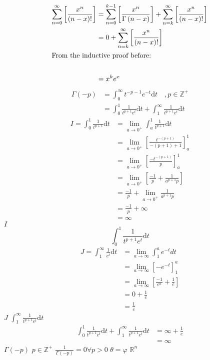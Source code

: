 \documentclass{article}
\begin{document}
\begin{align}
    \sum^{\infty}_{n= 0}   \left[ \frac{x^n}{\left( n- x \right)!} \right]  &= \sum^{k-1}_{n= 0}   \left[ \frac{x^{n}}{\Gamma\left( n- x \right)} \right]  +  \sum^{\infty}_{n= k}   \left[ \frac{x^{n}}{\left( n- x \right)!} \right] \\
    &= 0 +    \sum^{\infty}_{n= k}   \left[ \frac{x^{n}}{\left( n- x \right)!} \right] \\
    \intertext{From the inductive proof before:} \notag \\
    &= x^{k}e^{x}
\end{align}
\begin{align}
\Gamma (-p) &= \int_0^\infty t^{-p-1}e^{-t}\mathrm{d}t \quad , p \in \mathbb{Z}^{+}\\
&= \int_0^1 \frac{1}{t^{p+1}e^t} \mathrm{d}t + \int_1^\infty \frac{1}{t^{p+1}e^t} \mathrm{d}t
\end{align}
\begin{align}
I = \int_0^1 \frac{1}{t^{p+1}} \mathrm{d}t &= \lim_{a \to 0^+} \int_a^1 \frac{1}{t^{p+1}} \mathrm{d}t\\
&= \lim_{a \to 0^+} \left[ \frac{t^{-(p+1)}}{-(p+1)+1} \right]_a^1\\
&= \lim_{a \to 0^+} \left[ \frac{-t^{-(p+1)}}{p} \right]_a^1\\
&= \lim_{a \to 0^+} \left[ \frac{-1}{p} + \frac{1}{a^{p+1}p} \right]\\
&= \frac{-1}{p} + \lim_{a \to 0^+}\frac{1}{a^{p+1}p}\\
&= \frac{-1}{p} + \infty\\
&= \infty
\end{align}
$I$
$$\int_0^1 \frac{1}{t^{p+1}e^t} \mathrm{d}t$$
\begin{align}
J = \int_1^\infty \frac{1}{e^t}\mathrm{d}t &= \lim_{a \to \infty} \int_1^a e^{-t}dt\\
&= \lim_{a \to \infty} \left[ -e^{-t} \right]_1^a\\
&= \lim_{a \to \infty} \left[ \frac{-1}{e^a} + \frac{1}{e} \right]\\
&= 0 + \frac{1}{e}\\
&= \frac{1}{e}
\end{align}
$J$
$\int_1^\infty \frac{1}{t^{p+1}e^t}\mathrm{d}t$
\begin{align}
\int_0^1 \frac{1}{t^{p+1}e^t} \mathrm{d}t + \int_1^\infty \frac{1}{t^{p+1}e^t} \mathrm{d}t &= \infty + \frac{1}{e}\\
&= \infty
\end{align}
$\Gamma(-p)$
$p \in \mathbb{Z}^+$
$\frac{1}{\Gamma\left(-p\right)} = 0 \forall p > 0$
$\theta = \varphi$
$\mathbb{R}^{n}$
\end{document}
